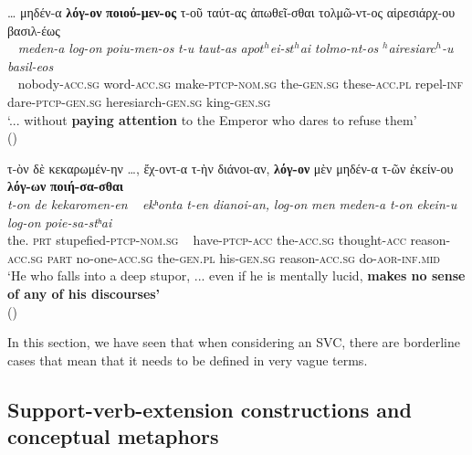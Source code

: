 \documentclass[output=paper,colorlinks,citecolor=brown]{langscibook}
\begin{document}

\ea\label{ex:vc:6}

\ea\label{ex:vc:6a}

\glll \ldots{} μηδέν-α \textbf{λόγ-ον} \textbf{ποιού-μεν-ος} τ-οῦ ταύτ-ας
ἀπωθεῖ-σθαι τολμῶ-ντ-ος αἱρεσιάρχ-ου βασιλ-έως\\
 ~ \textit{meden-a} \textit{log-o­n} \textit{poiu-men-os} \textit{t-u} \textit{taut-as} \textit{apo$t^h$ei-s$t^h$ai} \textit{tolmo-nt-os} \textit{$^h$airesiar$c^h$-u} \textit{basil-eos}\\
~ nobody-\textsc{acc.sg} word-\textsc{acc.sg} make-\textsc{ptcp-nom.sg} the-\textsc{gen.sg} these-\textsc{acc.pl} repel-\textsc{inf} dare-\textsc{ptcp-gen.sg}
heresiarch-\textsc{gen.sg} king-\textsc{gen.sg}\\
\glt `... without \textbf{paying attention} to the Emperor who dares to refuse them' \\
\hspace*{\fill}()

\ex\label{ex:vc:6b}

\largerpage
\glll τ-ὸν δὲ κεκαρωμέν-ην \ldots, ἔχ-οντ-α τ-ὴν διάνοι-αν, \textbf{λόγ-ον} μὲν μηδέν-α τ-ῶν ἐκείν-ου \textbf{λόγ-ων} \textbf{ποιή-σα-σθαι}\\
 \textit{t-on} \textit{de} \textit{kekaromen-en} ~ \textit{ekʰonta} \textit{t-en} \textit{dianoi-an,} \textit{log-on} \textit{men} \textit{meden-a} \textit{t-on} \textit{ekein-u} \textit{log-on} \textit{poie-sa-stʰai}\\
the. \textsc{prt} stupefied-\textsc{ptcp-nom.sg} ~ have-\textsc{ptcp-acc} the-\textsc{acc.sg} thought-\textsc{acc} reason-\textsc{acc.sg} \textsc{part} no-one-\textsc{acc.sg} the-\textsc{gen.pl}
his-\textsc{gen.sg}  reason-\textsc{acc.sg} do-\textsc{aor-inf.mid}\\
\glt `He who falls into a deep stupor, ... even if he is mentally lucid, \textbf{makes no sense of any of his discourses'} \\
\hspace*{\fill}()
\z
\z\clearpage


In this section, we have seen that when considering an
SVC, there are borderline cases that mean that it needs to be defined in
very vague terms.

\subsection{Support-verb-extension constructions and conceptual metaphors}\label{sec:vc:5:3}
\end{document}
